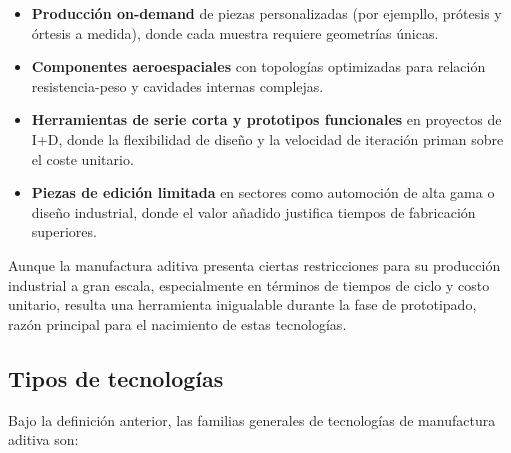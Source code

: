\begin{itemize}
  \item \textbf{Producción on-demand} de piezas personalizadas (por ejempllo, prótesis y órtesis a medida), donde cada muestra requiere geometrías únicas.  
  \item \textbf{Componentes aeroespaciales} con topologías optimizadas para relación resistencia-peso y cavidades internas complejas.  
  \item \textbf{Herramientas de serie corta y prototipos funcionales} en proyectos de I+D, donde la flexibilidad de diseño y la velocidad de iteración priman sobre el coste unitario.  
  \item \textbf{Piezas de edición limitada} en sectores como automoción de alta gama o diseño industrial, donde el valor añadido justifica tiempos de fabricación superiores.
\end{itemize}  

Aunque la manufactura aditiva presenta ciertas restricciones para su producción industrial a gran escala, especialmente en términos de tiempos de ciclo y costo unitario, resulta una herramienta inigualable durante la fase de prototipado, razón principal para el nacimiento de estas tecnologías.

\subsection{Tipos de tecnologías}

Bajo la definición anterior, las familias generales de tecnologías de manufactura aditiva son:

